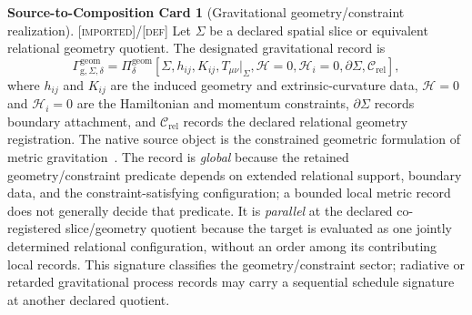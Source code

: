 \documentclass[11pt]{article}
\newcommand{\Defn}{\textsc{[def]}}
\newcommand{\Imp}{\textsc{[imported]}}
\theoremstyle{definition}
\newtheorem{compositioncard}{Source-to-Composition Card}
\begin{document}
\begin{compositioncard}[Gravitational geometry/constraint realization]
\label{card:gravity-geometry-realization}
\Imp{}/\Defn{} Let $\Sigma$ be a declared spatial slice or equivalent relational
geometry quotient. The designated gravitational record is
\begin{equation}
\Gamma_{\mathrm g,\Sigma,\delta}^{\mathrm{geom}}=
\Pi_{\delta}^{\mathrm{geom}}\!\left[
\Sigma,h_{ij},K_{ij},T_{\mu\nu}|_{\Sigma},
\mathcal H=0,\mathcal H_i=0,\partial\Sigma,\mathcal C_{\mathrm{rel}}
\right],
\label{eq:gravity-geometry-record}
\end{equation}
where $h_{ij}$ and $K_{ij}$ are the induced geometry and extrinsic-curvature data,
$\mathcal H=0$ and $\mathcal H_i=0$ are the Hamiltonian and momentum constraints,
$\partial\Sigma$ records boundary attachment, and $\mathcal C_{\mathrm{rel}}$
records the declared relational geometry registration. The native source object is
the constrained geometric formulation of metric gravitation~\cite{S_Einstein1916,
S_ArnowittDeserMisner1962}. The record is \emph{global} because the retained
geometry/constraint predicate depends on extended relational support, boundary data,
and the constraint-satisfying configuration; a bounded local metric record does not
generally decide that predicate. It is \emph{parallel} at the declared
co-registered slice/geometry quotient because the target is evaluated as one
jointly determined relational configuration, without an order among its contributing
local records. This signature classifies the geometry/constraint sector; radiative
or retarded gravitational process records may carry a sequential schedule signature
at another declared quotient.
\end{compositioncard}
\end{document}
